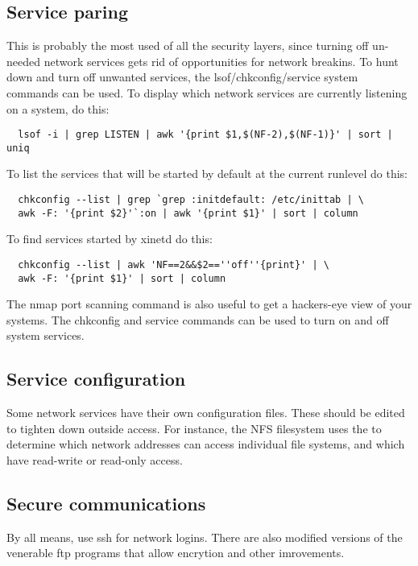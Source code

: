 \subsection{Service paring}

This is probably the most used of all the security layers, since turning off
un-needed network services gets rid of opportunities for network breakins.
To hunt down and turn off unwanted services, the lsof/chkconfig/service
system commands can be used. To display which network services are currently
listening on a system, do this:

\begin{verbatim}
  lsof -i | grep LISTEN | awk '{print $1,$(NF-2),$(NF-1)}' | sort | uniq
\end{verbatim}

\noindent To list the services that will be started by default at the current runlevel do this:

\begin{verbatim}
  chkconfig --list | grep `grep :initdefault: /etc/inittab | \
  awk -F: '{print $2}'`:on | awk '{print $1}' | sort | column
\end{verbatim}

\noindent To find services started by xinetd do this:

\begin{verbatim}
  chkconfig --list | awk 'NF==2&&$2==''off''{print}' | \
  awk -F: '{print $1}' | sort | column
\end{verbatim}

The nmap port scanning command is also useful to get a hackers-eye view of
your systems.  The chkconfig and service commands can be used to turn
on and off system services.

\subsection{Service configuration}

Some network services have their own configuration files. These should be 
edited to tighten down outside access.  For instance, the NFS filesystem
uses the \file{/etc/exports} to determine which network addresses can access
individual file systems, and which have read-write or read-only access.

\subsection{Secure communications}

By all means, use ssh for network logins.  There are also modified versions
of the venerable ftp programs that allow encrytion and other imrovements.
